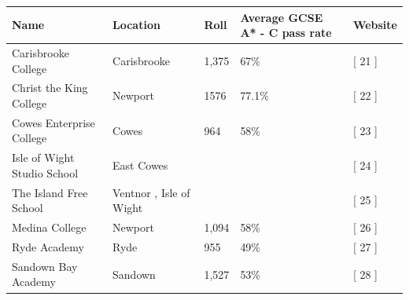 \documentclass{article}
\begin{document}
\begin{tabular}{lllll}
\toprule
Name & Location & Roll & Average GCSE A* - C pass rate & Website \\
\midrule
Carisbrooke College & Carisbrooke & 1,375 & 67\% & [ 21 ] \\
Christ the King College & Newport & 1576 & 77.1\% & [ 22 ] \\
Cowes Enterprise College & Cowes & 964 & 58\% & [ 23 ] \\
Isle of Wight Studio School & East Cowes &  &  & [ 24 ] \\
The Island Free School & Ventnor , Isle of Wight &  &  & [ 25 ] \\
Medina College & Newport & 1,094 & 58\% & [ 26 ] \\
Ryde Academy & Ryde & 955 & 49\% & [ 27 ] \\
Sandown Bay Academy & Sandown & 1,527 & 53\% & [ 28 ] \\
\bottomrule
\end{tabular}
\end{document}
